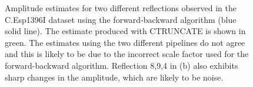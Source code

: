 \begin{figure}
\begin{subfigure}[b]{1.0\textwidth}
            \caption{}
            \label{fig:Amplitude estimates ref 8,9,4 - C.Esp1396I}
    \end{subfigure}
    \caption[Amplitude estimates for two different reflections observed in the C.Esp1396I dataset using the forward-backward algorithm.]{Amplitude estimates for two different reflections observed in the C.Esp1396I dataset using the forward-backward algorithm (blue solid line).
    The estimate produced with CTRUNCATE is shown in green.
    The estimates using the two different pipelines do not agree and this is likely to be due to the incorrect scale factor used for the forward-backward algorithm.
    Reflection 8,9,4 in (b) also exhibits sharp changes in the amplitude, which are likely to be noise.}
    \label{fig:Amplitude estimates - C.Esp1396I}
\end{figure}


